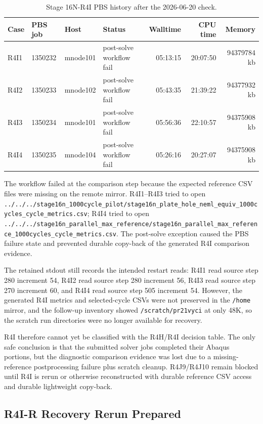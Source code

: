 \documentclass[11pt,a4paper]{article}
\newcommand{\code}[1]{\texttt{#1}}
\begin{document}
\begin{table}[H]
\centering
\caption{Stage 16N-R4I PBS history after the 2026-06-20 check.}
\begin{tabular}{llllrrr}
\toprule
Case & PBS job & Host & Status & Walltime & CPU time & Memory \\
\midrule
R4I1 & 1350232 & mnode101 & post-solve workflow fail & 05:13:15 & 20:07:50 & 94379784 kb \\
R4I2 & 1350233 & mnode102 & post-solve workflow fail & 05:43:35 & 21:39:22 & 94377932 kb \\
R4I3 & 1350234 & mnode101 & post-solve workflow fail & 05:56:36 & 22:10:57 & 94375908 kb \\
R4I4 & 1350235 & mnode104 & post-solve workflow fail & 05:26:16 & 20:27:07 & 94375908 kb \\
\bottomrule
\end{tabular}
\end{table}

The workflow failed at the comparison step because the expected reference CSV files were missing on the remote mirror. R4I1--R4I3 tried to open \code{../../../stage16n\_1000cycle\_pilot/stage16n\_plate\_hole\_neml\_equiv\_1000cycles\_cycle\_metrics.csv}; R4I4 tried to open \code{../../../stage16n\_parallel\_max\_reference/stage16n\_parallel\_max\_reference\_1000cycles\_cycle\_metrics.csv}. The post-solve exception caused the PBS failure state and prevented durable copy-back of the generated R4I comparison evidence.

The retained stdout still records the intended restart reads: R4I1 read source step 280 increment 54, R4I2 read source step 280 increment 56, R4I3 read source step 270 increment 60, and R4I4 read source step 505 increment 54. However, the generated R4I metrics and selected-cycle CSVs were not preserved in the \code{/home} mirror, and the follow-up inventory showed \code{/scratch/pr21vyci} at only 48K, so the scratch run directories were no longer available for recovery.

R4I therefore cannot yet be classified with the R4H/R4I decision table. The only safe conclusion is that the submitted solver jobs completed their Abaqus portions, but the diagnostic comparison evidence was lost due to a missing-reference postprocessing failure plus scratch cleanup. R4J9/R4J10 remain blocked until R4I is rerun or otherwise reconstructed with durable reference CSV access and durable lightweight copy-back.

\subsection{R4I-R Recovery Rerun Prepared}
\end{document}
